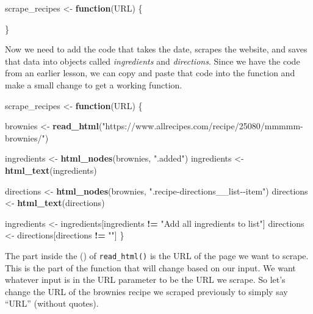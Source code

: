 \documentclass[
  12pt,
]{book}
\newenvironment{Shaded}{\begin{snugshade}}{\end{snugshade}}
\newcommand{\ControlFlowTok}[1]{\textcolor[rgb]{0.27,0.27,0.27}{\textbf{#1}}}
\newcommand{\KeywordTok}[1]{\textcolor[rgb]{0.27,0.27,0.27}{\textbf{#1}}}
\newcommand{\NormalTok}[1]{#1}
\newcommand{\OperatorTok}[1]{\textcolor[rgb]{0.43,0.43,0.43}{\textbf{#1}}}
\newcommand{\StringTok}[1]{\textcolor[rgb]{0.5,0.5,0.5}{#1}}
\begin{document}
\begin{Shaded}
\begin{Highlighting}[]
\NormalTok{scrape\_recipes <{-}}\StringTok{ }\ControlFlowTok{function}\NormalTok{(URL) \{}
  
\NormalTok{\}}
\end{Highlighting}
\end{Shaded}

Now we need to add the code that takes the date, scrapes the website, and saves that data into objects called \emph{ingredients} and \emph{directions}. Since we have the code from an earlier lesson, we can copy and paste that code into the function and make a small change to get a working function.

\begin{Shaded}
\begin{Highlighting}[]
\NormalTok{scrape\_recipes <{-}}\StringTok{ }\ControlFlowTok{function}\NormalTok{(URL) \{}
  
\NormalTok{  brownies <{-}}\StringTok{ }\KeywordTok{read\_html}\NormalTok{(}\StringTok{"https://www.allrecipes.com/recipe/25080/mmmmm{-}brownies/"}\NormalTok{)}
  
\NormalTok{  ingredients <{-}}\StringTok{ }\KeywordTok{html\_nodes}\NormalTok{(brownies, }\StringTok{".added"}\NormalTok{)}
\NormalTok{  ingredients <{-}}\StringTok{ }\KeywordTok{html\_text}\NormalTok{(ingredients)}
  
\NormalTok{  directions <{-}}\StringTok{ }\KeywordTok{html\_nodes}\NormalTok{(brownies, }\StringTok{".recipe{-}directions\_\_list{-}{-}item"}\NormalTok{)}
\NormalTok{  directions <{-}}\StringTok{ }\KeywordTok{html\_text}\NormalTok{(directions)}
  
\NormalTok{  ingredients <{-}}\StringTok{ }\NormalTok{ingredients[ingredients }\OperatorTok{!=}\StringTok{ "Add all ingredients to list"}\NormalTok{]}
\NormalTok{  directions <{-}}\StringTok{ }\NormalTok{directions[directions }\OperatorTok{!=}\StringTok{ ""}\NormalTok{]}
\NormalTok{\}}
\end{Highlighting}
\end{Shaded}

The part inside the () of \texttt{read\_html()} is the URL of the page we want to scrape. This is the part of the function that will change based on our input. We want whatever input is in the URL parameter to be the URL we scrape. So let's change the URL of the brownies recipe we scraped previously to simply say ``URL'' (without quotes).
\end{document}
